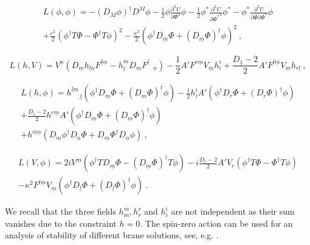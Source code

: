 \documentclass[a4paper,12pt]{article}
\begin{document}
\begin{eqnarray}
L(\phi,\phi)= -(D_M\phi)^{\dagger} D^M \phi
-\frac{1}{2}\phi \frac{\partial^2 U}{\partial \Phi^2}\phi
-\frac{1}{2}\phi^* \frac{\partial^2 U}{\partial {\Phi^*}^2}\phi^*
-\phi^* \frac{\partial^2 U}{\partial \Phi\partial \Phi^*}\phi
\nonumber
\\
+\frac{e^2}{2}\left(\phi^\dagger T \Phi - \Phi^\dagger T
\phi\right)^2
-\frac{\kappa^2}{2}\left(\phi^\dagger D_{\underline m} \Phi +
(D_{\underline m} \Phi)^\dagger \phi\right)^2~,
\end{eqnarray}

\begin{equation}
L(h,V)=V^{\underline n}
\left(D_{\underline m}h_{\underline l \underline n}F^{\underline l
\underline m} -h_{\underline l}^{\underline m}D_{\underline m}
F^{\underline l}_{\quad \underline n}\right)
-\frac{1}{2}A' F^{r \underline m}V_{\underline m}h_i^i
+\frac{D_1-2}{2}A' F^{\underline l \underline m}
V_{\underline m}h_{r\underline l}~,
\end{equation}

\begin{eqnarray}
L(h,\phi)=h^{\underline l \underline m}_{\quad;{ \underline l}}
\left(\phi^\dagger D_{\underline m}\Phi + ( D_{\underline
m}\Phi)^\dagger \phi\right)
-\frac{1}{2}h_i^i A' \left(\phi^\dagger D_r\Phi +
(D_r\Phi)^\dagger\phi\right)
\nonumber
\\
+\frac{D_1-2}{2}h^{r \underline m} A'
\left(\phi^\dagger D_{\underline m}\Phi + (D_{\underline
m}\Phi)^\dagger \phi\right) \\
+h^{\underline m\underline
n}(D_{\underline m}\phi^{\dagger} D_{\underline n}\Phi +
D_{\underline m} \Phi^{\dagger}D_{\underline n} \phi)~,
\nonumber
\end{eqnarray}

\begin{eqnarray}
L(V,\phi)=2 i V^{\underline m}
\left(\phi^\dagger T D_{\underline m}\Phi - (D_{\underline
m}\Phi)^\dagger T \phi\right)
-i \frac{D_1-2}{2} A' V_r\left(\phi^\dagger T \Phi - \Phi^\dagger T
\phi\right)
\nonumber\\
-\kappa^2F^{\underline l \underline m}V_{\underline m}
\left(\phi^\dagger D_{\underline l}\Phi + (D_{\underline
l}\Phi)^\dagger \phi\right)~.
\end{eqnarray}

We recall that the three fields $h^m_{m}, h^r _{r}$ and $h^i _{i}$
are not independent as their sum vanishes due to the constraint
$h=0$. The spin-zero action can be used for an analysis of stability
of different brane solutions, see, e.g. \cite{Lavrelashvili:aa}.
\end{document}

